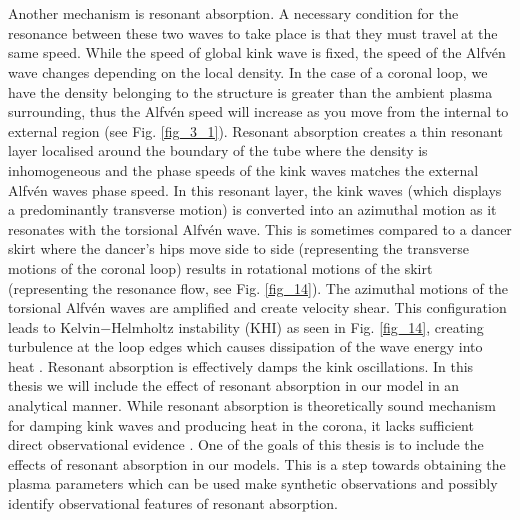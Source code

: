 \documentclass[12pt,a4paper,twoside]{article}
\newcommand{\Alfven}{Alfv\'{e}n }
\begin{document}
\\ \\ Another mechanism is resonant absorption. A necessary condition for the resonance between these two waves to take place is that they must travel at the same speed. While the speed of global kink wave is fixed, the speed of the \Alfven wave changes depending on the local density. In the case of a coronal loop, we have the density belonging to the structure is greater than the ambient plasma surrounding, thus the \Alfven speed will increase as you move from the internal to external region (see Fig. \ref{fig_3_1}). Resonant absorption creates a thin resonant layer localised around the boundary of the tube where the density is inhomogeneous and the phase speeds of the kink waves matches the external \Alfven waves phase speed. In this resonant layer, the kink waves (which displays a predominantly transverse motion) is converted into an azimuthal motion as it resonates with the torsional \Alfven wave. This is sometimes compared to a dancer skirt where the dancer's hips move side to side (representing the transverse motions of the coronal loop) results in rotational motions of the skirt (representing the resonance flow, see Fig. \ref{fig_14}). The azimuthal motions of the torsional \Alfven waves are amplified and create velocity shear. This configuration leads to Kelvin$-$Helmholtz instability (KHI) as seen in Fig. \ref{fig_14}, creating turbulence at the loop edges which causes dissipation of the wave energy into heat \citep{Antolin_2015b}. Resonant absorption is effectively damps the kink oscillations. In this thesis we will include the effect of resonant absorption in our model in an analytical manner. While resonant absorption is theoretically sound mechanism for damping kink waves and producing heat in the corona, it lacks sufficient direct observational evidence \citep{Antolin_2015a}. One of the goals of this thesis is to include the effects of resonant absorption in our models. This is a step towards obtaining the plasma parameters which can be used make synthetic observations and possibly identify observational features of resonant absorption.                      
\end{document}
